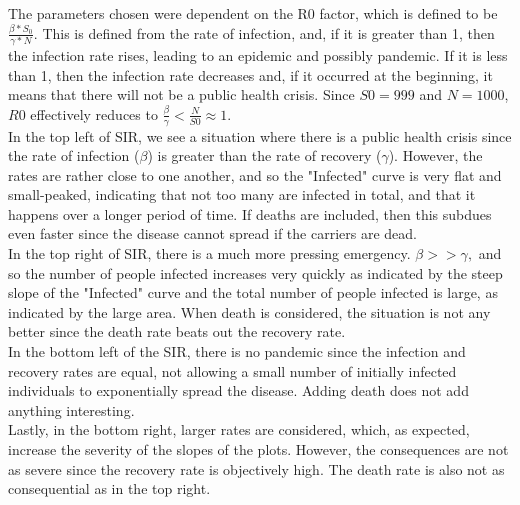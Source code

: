 \documentclass[11pt]{article}
\begin{document}
The parameters chosen were dependent on the R0 factor, which is defined to be $\frac{\beta*S_0}{\gamma*N}.$ This is defined from the rate of infection, and, if it is greater than 1, then the infection rate rises, leading to an epidemic and possibly pandemic. If it is less than 1, then the infection rate decreases and, if it occurred at the beginning, it means that there will not be a public health crisis. Since $S0 = 999$ and $N = 1000$, $R0$ effectively reduces to $\frac{\beta}{\gamma} < \frac{N}{S0} \approx 1.$\\
In the top left of SIR, we see a situation where there is a public health crisis since the rate of infection ($\beta$) is greater than the rate of recovery ($\gamma$). However, the rates are rather close to one another, and so the "Infected" curve is very flat and small-peaked, indicating that not too many are infected in total, and that it happens over a longer period of time. If deaths are included, then this subdues even faster since the disease cannot spread if the carriers are dead.\\
In the top right of SIR, there is a much more pressing emergency. $\beta >> \gamma,$ and so the number of people infected increases very quickly as indicated by the steep slope of the "Infected" curve and the total number of people infected is large, as indicated by the large area. When death is considered, the situation is not any better since the death rate beats out the recovery rate.\\
In the bottom left of the SIR, there is no pandemic since the infection and recovery rates are equal, not allowing a small number of initially infected individuals to exponentially spread the disease. Adding death does not add anything interesting.\\
Lastly, in the bottom right, larger rates are considered, which, as expected, increase the severity of the slopes of the plots. However, the consequences are not as severe since the recovery rate is objectively high. The death rate is also not as consequential as in the top right.
\end{document}
